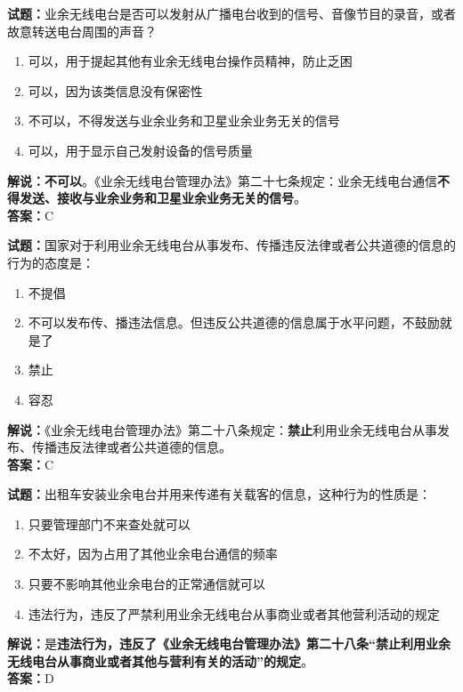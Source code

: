 \documentclass{ctexbook}
\begin{document}
\bigskip


\noindent\textbf{试题：}业余无线电台是否可以发射从广播电台收到的信号、音像节目的录音，或者故意转送电台周围的声音？
\begin{enumerate}[leftmargin=3em]
\item 可以，用于提起其他有业余无线电台操作员精神，防止乏困
\item 可以，因为该类信息没有保密性
\item 不可以，不得发送与业余业务和卫星业余业务无关的信号
\item 可以，用于显示自己发射设备的信号质量
\end{enumerate}
\textbf{解说：不可以}。《业余无线电台管理办法》第二十七条规定：业余无线电台通信\textbf{不得发送、接收与业余业务和卫星业余业务无关的信号}。\\\noindent\textbf{答案：}C





\bigskip


\noindent\textbf{试题：}国家对于利用业余无线电台从事发布、传播违反法律或者公共道德的信息的行为的态度是：
\begin{enumerate}[leftmargin=3em]
\item 不提倡
\item 不可以发布传、播违法信息。但违反公共道德的信息属于水平问题，不鼓励就是了
\item 禁止
\item 容忍
\end{enumerate}
\noindent\textbf{解说：}《业余无线电台管理办法》第二十八条规定：\textbf{禁止}利用业余无线电台从事发布、传播违反法律或者公共道德的信息。\\\noindent\textbf{答案：}C



\bigskip


\noindent\textbf{试题：}出租车安装业余电台并用来传递有关载客的信息，这种行为的性质是：
\begin{enumerate}[leftmargin=3em]
\item 只要管理部门不来查处就可以
\item 不太好，因为占用了其他业余电台通信的频率
\item 只要不影响其他业余电台的正常通信就可以
\item 违法行为，违反了严禁利用业余无线电台从事商业或者其他营利活动的规定%
\end{enumerate}
\noindent\textbf{解说：}是\textbf{违法行为，违反了《业余无线电台管理办法》第二十八条“禁止利用业余无线电台从事商业或者其他与营利有关的活动”的规定}。\\\noindent\textbf{答案：}D
\end{document}

